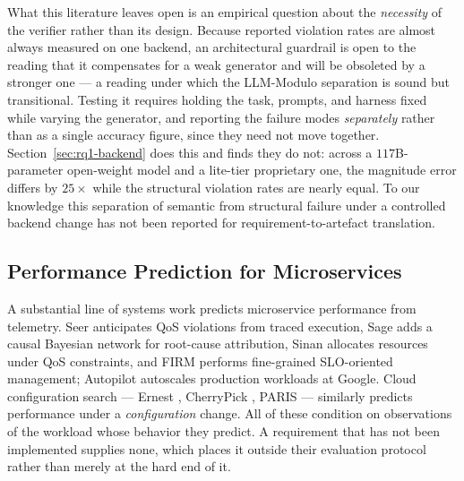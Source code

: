 \documentclass[journal, 10pt]{IEEEtran}
\begin{document}
What this literature leaves open is an empirical question about the
\emph{necessity} of the verifier rather than its design. Because reported
violation rates are almost always measured on one backend, an architectural
guardrail is open to the reading that it compensates for a weak generator and
will be obsoleted by a stronger one --- a reading under which
the LLM-Modulo separation \cite{kambhampati2024} is sound but transitional. Testing it
requires holding the task, prompts, and harness fixed while varying the
generator, and reporting the failure modes \emph{separately} rather than as a
single accuracy figure, since they need not move together.
Section~\ref{sec:rq1-backend} does this and finds they do not: across a
$117$B-parameter open-weight model and a lite-tier proprietary one, the
magnitude error differs by $25{\times}$ while the structural violation rates are
nearly equal. To our knowledge this separation of semantic from structural
failure under a controlled backend change has not been reported for
requirement-to-artefact translation.

\subsection{Performance Prediction for Microservices}
A substantial line of systems work predicts microservice performance from
telemetry. Seer \cite{gan2019seer} anticipates QoS violations from traced
execution, Sage \cite{gan2021sage} adds a causal Bayesian network for
root-cause attribution, Sinan \cite{zhang2021sinan} allocates resources under
QoS constraints, and FIRM \cite{qiu2020firm} performs fine-grained SLO-oriented
management; Autopilot \cite{rzadca2020autopilot} autoscales production workloads
at Google. Cloud configuration search --- Ernest \cite{venkataraman2016ernest},
CherryPick \cite{alipourfard2017cherrypick}, PARIS \cite{yadwadkar2017paris} --- similarly predicts performance under a \emph{configuration} change. All of these
condition on observations of the workload whose behavior they predict. A
requirement that has not been implemented supplies none, which places it outside
their evaluation protocol rather than merely at the hard end of it.
\end{document}
